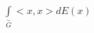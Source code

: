 \documentclass[11pt, twoside]{article}
\begin{document}
$\int\limits_{\overset{\sim }{G}}<x,x>dE(x)$
\end{document}
